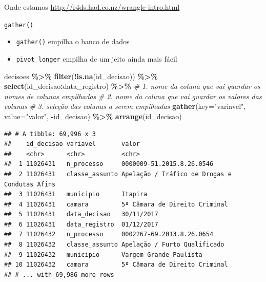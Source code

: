 \documentclass[
  9pt,
  ignorenonframetext,
]{beamer}
\newenvironment{Shaded}{\begin{snugshade}}{\end{snugshade}}
\newcommand{\CommentTok}[1]{\textcolor[rgb]{0.56,0.35,0.01}{\textit{#1}}}
\newcommand{\DataTypeTok}[1]{\textcolor[rgb]{0.13,0.29,0.53}{#1}}
\newcommand{\KeywordTok}[1]{\textcolor[rgb]{0.13,0.29,0.53}{\textbf{#1}}}
\newcommand{\NormalTok}[1]{#1}
\newcommand{\OperatorTok}[1]{\textcolor[rgb]{0.81,0.36,0.00}{\textbf{#1}}}
\newcommand{\StringTok}[1]{\textcolor[rgb]{0.31,0.60,0.02}{#1}}
\begin{document}
\begin{frame}{Onde estamos}
\protect\hypertarget{onde-estamos}{}
\url{http://r4ds.had.co.nz/wrangle-intro.html}
\end{frame}

\begin{frame}[fragile]{\texttt{gather()}}
\protect\hypertarget{gather}{}
\begin{itemize}
\item
  \texttt{gather()} empilha o banco de dados
\item
  \texttt{pivot\_longer} empilha de um jeito ainda mais fácil
\end{itemize}

\begin{Shaded}
\begin{Highlighting}[]
\NormalTok{decisoes }\OperatorTok{\%\textgreater{}\%}\StringTok{ }
\StringTok{  }\KeywordTok{filter}\NormalTok{(}\OperatorTok{!}\KeywordTok{is.na}\NormalTok{(id\_decisao)) }\OperatorTok{\%\textgreater{}\%}\StringTok{ }
\StringTok{  }\KeywordTok{select}\NormalTok{(id\_decisao}\OperatorTok{:}\NormalTok{data\_registro) }\OperatorTok{\%\textgreater{}\%}\StringTok{ }
\StringTok{  }\CommentTok{\# 1. nome da coluna que vai guardar os nomes de colunas empilhadas}
\StringTok{  }\CommentTok{\# 2. nome da coluna que vai guardar os valores das colunas}
\StringTok{  }\CommentTok{\# 3. seleção das colunas a serem empilhadas}
\StringTok{  }\KeywordTok{gather}\NormalTok{(}\DataTypeTok{key=}\StringTok{"variavel"}\NormalTok{, }\DataTypeTok{value=}\StringTok{"valor"}\NormalTok{, }\OperatorTok{{-}}\NormalTok{id\_decisao) }\OperatorTok{\%\textgreater{}\%}\StringTok{ }
\StringTok{  }\KeywordTok{arrange}\NormalTok{(id\_decisao)}
\end{Highlighting}
\end{Shaded}

\begin{verbatim}
## # A tibble: 69,996 x 3
##    id_decisao variavel       valor                                        
##    <chr>      <chr>          <chr>                                        
##  1 11026431   n_processo     0000009-51.2015.8.26.0546                    
##  2 11026431   classe_assunto Apelação / Tráfico de Drogas e Condutas Afins
##  3 11026431   municipio      Itapira                                      
##  4 11026431   camara         5ª Câmara de Direito Criminal                
##  5 11026431   data_decisao   30/11/2017                                   
##  6 11026431   data_registro  01/12/2017                                   
##  7 11026432   n_processo     0002267-69.2013.8.26.0654                    
##  8 11026432   classe_assunto Apelação / Furto Qualificado                 
##  9 11026432   municipio      Vargem Grande Paulista                       
## 10 11026432   camara         5ª Câmara de Direito Criminal                
## # ... with 69,986 more rows
\end{verbatim}
\end{frame}
\end{document}
